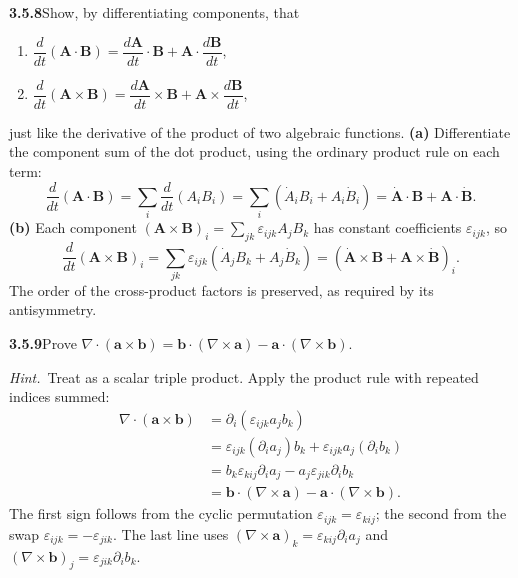\par\bigskip
\noindent\textbf{3.5.8}\quad Show, by differentiating components, that
\begin{enumerate}
\item[(a)] $\dfrac{d}{dt}(\mathbf{A}\cdot\mathbf{B})
  =\dfrac{d\mathbf{A}}{dt}\cdot\mathbf{B}
  +\mathbf{A}\cdot\dfrac{d\mathbf{B}}{dt}$,
\item[(b)] $\dfrac{d}{dt}(\mathbf{A}\times\mathbf{B})
  =\dfrac{d\mathbf{A}}{dt}\times\mathbf{B}
  +\mathbf{A}\times\dfrac{d\mathbf{B}}{dt}$,
\end{enumerate}
just like the derivative of the product of two algebraic functions.
\solution
\textbf{(a)} Differentiate the component sum of the dot product, using
the ordinary product rule on each term:
\[
\frac d{dt}(\mathbf A\cdot\mathbf B)
=\sum_i\frac d{dt}(A_iB_i)
=\sum_i(\dot A_iB_i+A_i\dot B_i)
=\dot{\mathbf A}\cdot\mathbf B+\mathbf A\cdot\dot{\mathbf B}.
\]
\textbf{(b)} Each component
$(\mathbf A\times\mathbf B)_i=\sum_{jk}\varepsilon_{ijk}A_jB_k$ has
constant coefficients $\varepsilon_{ijk}$, so
\[
\frac d{dt}(\mathbf A\times\mathbf B)_i
=\sum_{jk}\varepsilon_{ijk}(\dot A_jB_k+A_j\dot B_k)
=(\dot{\mathbf A}\times\mathbf B+\mathbf A\times\dot{\mathbf B})_i.
\]
The order of the cross-product factors is preserved, as required by
its antisymmetry.

\par\bigskip
\noindent\textbf{3.5.9}\quad Prove
$\nabla\cdot(\mathbf{a}\times\mathbf{b})
=\mathbf{b}\cdot(\nabla\times\mathbf{a})
-\mathbf{a}\cdot(\nabla\times\mathbf{b})$.

\emph{Hint.}~Treat as a scalar triple product.
\solution
Apply the product rule with repeated indices summed:
\[
\begin{aligned}
\nabla\cdot(\mathbf a\times\mathbf b)
&=\partial_i(\varepsilon_{ijk}a_jb_k)\\
&=\varepsilon_{ijk}(\partial_i a_j)b_k+
\varepsilon_{ijk}a_j(\partial_i b_k)\\
&=b_k\varepsilon_{kij}\partial_i a_j
-a_j\varepsilon_{jik}\partial_i b_k\\
&=\boxed{\mathbf b\cdot(\nabla\times\mathbf a)
-\mathbf a\cdot(\nabla\times\mathbf b)}.
\end{aligned}
\]
The first sign follows from the cyclic permutation
$\varepsilon_{ijk}=\varepsilon_{kij}$; the second from the swap
$\varepsilon_{ijk}=-\varepsilon_{jik}$. The last line uses
$(\nabla\times\mathbf a)_k=\varepsilon_{kij}\partial_ia_j$ and
$(\nabla\times\mathbf b)_j=\varepsilon_{jik}\partial_ib_k$.

